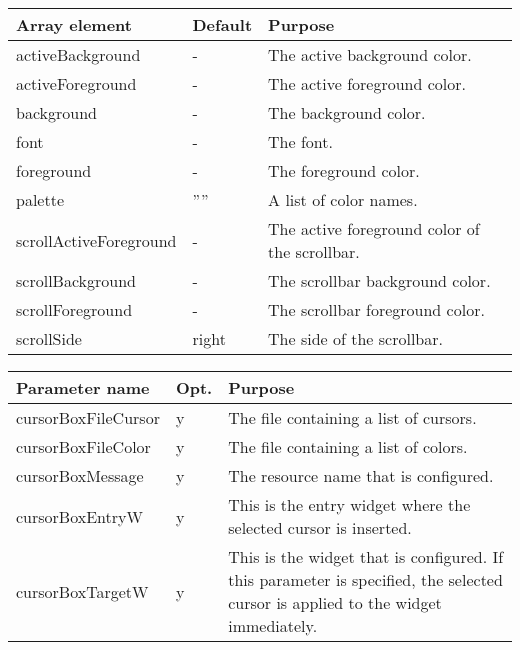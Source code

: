 {\newpage
\clearpage
\samepage \begin{tabular}{|l|l|p{5.5cm}|} \hline
Array element          & Default & Purpose\\  \hline
activeBackground       & -       & The active background
                                   color.\\  \hline
activeForeground       & -       & The active foreground
                                   color.\\  \hline
background             & -       & The background color.\\  \hline
font                   & -       & The font.\\  \hline
foreground             & -       & The foreground color.\\  \hline
palette                & ''''    & A list of color names.\\  \hline
scrollActiveForeground & -       & The active foreground
                                   color of the scrollbar.\\  \hline
scrollBackground       & -       & The scrollbar background
                                   color.\\  \hline
scrollForeground       & -       & The scrollbar foreground
                                   color.\\  \hline
scrollSide             & right   & The side of the
                                   scrollbar.\\  \hline
\end{tabular}
}

{\newpage
\clearpage
\samepage \begin{figure}[ht]
  \centerline{
  \epsfysize=6cm
  }

  \label{fig:ColorBox}
\end{figure}
}

{\newpage
\clearpage
\samepage \begin{tabular}{|l|l|p{6.3cm}|} \hline
Parameter name      & Opt. & Purpose \\  \hline
cursorBoxFileCursor & y    & The file containing a list of
                             cursors. \\  \hline
cursorBoxFileColor  & y    & The file containing a list of
                             colors. \\  \hline
cursorBoxMessage    & y    & The resource name that is
                             configured. \\  \hline
cursorBoxEntryW     & y    & This is the entry widget where
                             the selected cursor is
                             inserted. \\  \hline
cursorBoxTargetW    & y    & This is the widget that is
                             configured. If this parameter
                             is specified, the selected
                             cursor is applied to the widget
                             immediately. \\  \hline
\end{tabular}
}

